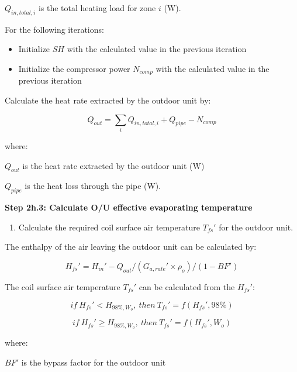\(Q_{in,total,i}\) is the total heating load for zone \(i\) (W).

For the following iterations:

\begin{itemize}
\item
  Initialize \(SH\) with the calculated value in the previous iteration
\item
  Initialize the compressor power \(N_{comp}\) with the calculated value in the previous iteration
\end{itemize}

Calculate the heat rate extracted by the outdoor unit by:

\begin{equation}
Q_{out} = \sum_iQ_{in,total,i}+Q_{pipe}-N_{comp}
\end{equation}

where:

\(Q_{out}\) is the heat rate extracted by the outdoor unit (W)

\(Q_{pipe}\) is the heat loss through the pipe (W).

\textbf{Step 2h.3: Calculate O/U effective evaporating temperature} 

\begin{enumerate}
\def\labelenumi{(\arabic{enumi})}
\tightlist
\item
  Calculate the required coil surface air temperature \({T_{fs}}'\) for the outdoor unit.
\end{enumerate}

The enthalpy of the air leaving the outdoor unit can be calculated by:

\begin{equation}
{H_{fs}}' = {H_{in}}'-Q_{out}/({G_{a,rate}}'\times{\rho_o})/(1-BF')
\end{equation}

The coil surface air temperature \({T_{fs}}'\) can be calculated from the \({H_{fs}}'\):

\begin{equation}
if~{H_{fs}}'<H_{98\%,W_o}{,~then~}{T_{fs}}' = f({H_{fs}}',98\%)
\end{equation}

\begin{equation}
if~{H_{fs}}'\ge{H_{98\%,W_o}}{,~then~}{T_{fs}}' = f({H_{fs}}',W_o)
\end{equation}

where:

\(BF'\) is the bypass factor for the outdoor unit

